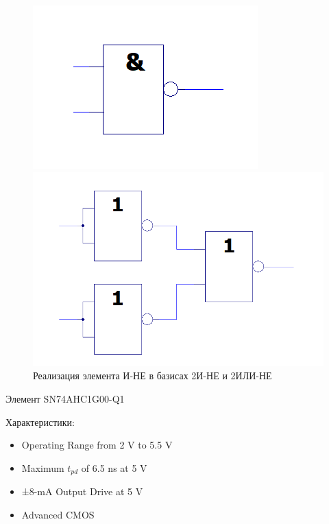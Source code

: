 \begin{figure}[H]
	\centering
	\begin{minipage}{.45\textwidth}
		\centering
		\includegraphics[width=0.85\linewidth]{imgs/1/and-not_and}
	\end{minipage}
	\begin{minipage}{.45\textwidth}
		\centering
		\includegraphics[width=0.85\linewidth]{imgs/1/and-not_or}
	\end{minipage}
	\caption{Реализация элемента И-НЕ в базисах 2И-НЕ и 2ИЛИ-НЕ}
\end{figure}

Элемент SN74AHC1G00-Q1

Характеристики:
\begin{itemize}
	\item Operating Range from 2 V to 5.5 V
	\item Maximum $t_{pd}$ of 6.5 ns at 5 V
	\item ±8-mA Output Drive at 5 V
	\item Advanced CMOS 
\end{itemize}

